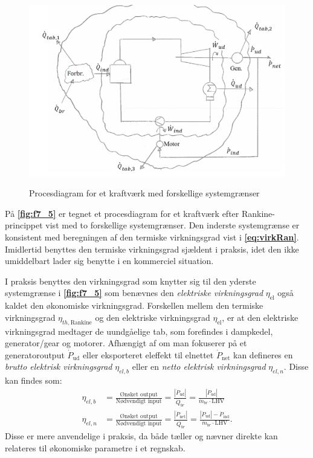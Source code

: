 \begin{figure} [ht]
  \centering
  \caption{Procesdiagram for et kraftværk med forskellige systemgrænser}
  \includegraphics[width=0.5\linewidth]{./figures/f7_5.png}
  \label{fig:f7_5}
\end{figure}
På \textbf{\autoref{fig:f7_5}} er tegnet et procesdiagram for et kraftværk efter Rankine-princippet vist med to forskellige systemgrænser. Den inderste systemgrænse er konsistent med beregningen af den termiske virkningsgrad vist i \textbf{\autoref{eq:virkRan}}. Imidlertid benyttes den termiske virkningsgrad sjældent i praksis, idet den ikke umiddelbart lader sig benytte i en kommerciel situation. 

I praksis benyttes den virkningsgrad som knytter sig til den yderste systemgrænse i \textbf{\autoref{fig:f7_5}} som benævnes den \textit{elektriske virkningsgrad} $\eta_{\mathrm{el}}$ også kaldet den økonomiske virkningsgrad. Forskellen mellem den termiske virkningsgrad $\eta_{th, \mathrm{Rankine}}$ og den elektriske virkningsgrad $\eta_{\mathrm{el}}$, er at den elektriske virkningsgrad medtager de uundgåelige tab, som forefindes i dampkedel, generator/gear og motorer. Afhængigt af om man fokuserer på et generatoroutput $\dot{P}_{\mathrm{ud}}$ eller eksporteret eleffekt til elnettet $\dot{P}_{\mathrm{net}}$ kan defineres en \textit{brutto elektrisk virkningsgrad} $\eta_{el, b}$ eller en \textit{netto elektrisk virkningsgrad} $\eta_{el, n}$. Disse kan findes som:
\begin{align*}
  \eta_{el, b} &= \frac{\text{Ønsket output}}{\text{Nødvendigt input}} = \frac{\left| \dot{P}_{\mathrm{ud}} \right|}{\dot{Q}_{br}} = \frac{\left| \dot{P}_{\mathrm{ud}} \right|}{\dot{m}_{br} \cdot \mathrm{LHV}} \\
  \eta_{el, n} &= \frac{\text{Ønsket output}}{\text{Nødvendigt input}} = \frac{\left| \dot{P}_{\mathrm{net}} \right|}{\dot{Q}_{br}} = \frac{\left| \dot{P}_{\mathrm{ud}} \right| - \dot{P}_{\mathrm{ind}}}{\dot{m}_{br} \cdot \mathrm{LHV}}
.\end{align*}
Disse er mere anvendelige i praksis, da både tæller og nævner direkte kan relateres til økonomiske parametre i et regnskab.


